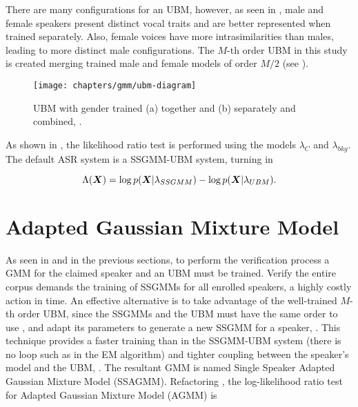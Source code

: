 There are many configurations for an UBM, however, as seen in , male and female speakers present distinct vocal traits and are better represented when trained separately. Also, female voices have more intrasimilarities than males, leading to more distinct male configurations. The $M$-th order UBM in this study is created merging trained male and female models of order $M/2$ (see ).

\begin{figure}[ht]
    \centering
    \texttt{[image: chapters/gmm/ubm-diagram]}
    \caption{UBM with gender trained (a) together and (b) separately and combined, .}
    \label{fig:ubm-diagram}
\end{figure}

As shown in , the likelihood ratio test is performed using the models $\lambda_{C}$ and $\lambda_{bkg}$. The default ASR system is a SSGMM-UBM system, turning  in

\begin{equation}
    \Lambda(\dvec{X}) = \log p(\dvec{X}|\lambda_{SSGMM}) - \log p(\dvec{X}|\lambda_{UBM}).
    \label{eq:score_of_X_ssgmm_ubm}
\end{equation}

\section{Adapted Gaussian Mixture Model}
\label{sec:adapted-gmm}

As seen in  and in the previous sections, to perform the verification process a GMM for the claimed speaker and an UBM must be trained. Verify the entire corpus demands the training of SSGMMs for all enrolled speakers, a highly costly action in time. An effective alternative is to take advantage of the well-trained $M$-th order UBM, since the SSGMMs and the UBM must have the same order to use , and adapt its parameters to generate a new SSGMM for a speaker, . This technique provides a faster training than in the SSGMM-UBM system (there is no loop such as in the EM algorithm) and tighter coupling between the speaker’s model and the UBM, . The resultant GMM is named Single Speaker Adapted Gaussian Mixture Model (SSAGMM). Refactoring , the log-likelihood ratio test for Adapted Gaussian Mixture Model (AGMM) is

